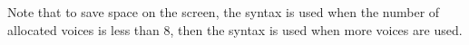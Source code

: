 Note that to save space on the screen, the  syntax is used when the number of allocated voices is less than 8, then the  syntax is used when more voices are used.

%
%
%
%
%
%
